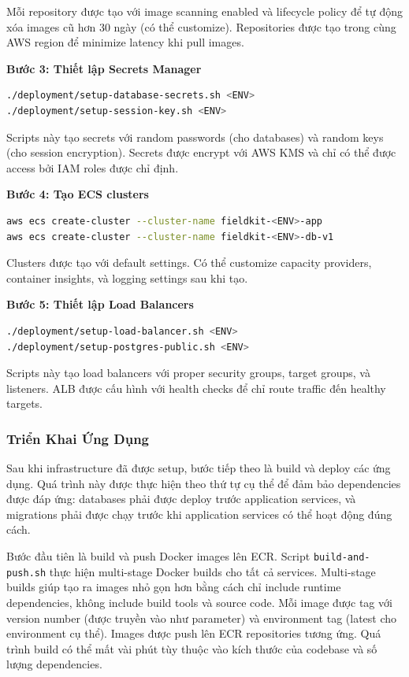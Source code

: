 Mỗi repository được tạo với image scanning enabled và lifecycle policy để tự động xóa images cũ hơn 30 ngày (có thể customize). Repositories được tạo trong cùng AWS region để minimize latency khi pull images.

\textbf{Bước 3: Thiết lập Secrets Manager}
\begin{lstlisting}[language=bash, caption=Thiết lập secrets]
./deployment/setup-database-secrets.sh <ENV>
./deployment/setup-session-key.sh <ENV>
\end{lstlisting}

Scripts này tạo secrets với random passwords (cho databases) và random keys (cho session encryption). Secrets được encrypt với AWS KMS và chỉ có thể được access bởi IAM roles được chỉ định.

\textbf{Bước 4: Tạo ECS clusters}
\begin{lstlisting}[language=bash, caption=Tạo ECS clusters]
aws ecs create-cluster --cluster-name fieldkit-<ENV>-app
aws ecs create-cluster --cluster-name fieldkit-<ENV>-db-v1
\end{lstlisting}

Clusters được tạo với default settings. Có thể customize capacity providers, container insights, và logging settings sau khi tạo.

\textbf{Bước 5: Thiết lập Load Balancers}
\begin{lstlisting}[language=bash, caption=Thiết lập load balancers]
./deployment/setup-load-balancer.sh <ENV>
./deployment/setup-postgres-public.sh <ENV>
\end{lstlisting}

Scripts này tạo load balancers với proper security groups, target groups, và listeners. ALB được cấu hình với health checks để chỉ route traffic đến healthy targets.

\subsubsection{Triển Khai Ứng Dụng}

Sau khi infrastructure đã được setup, bước tiếp theo là build và deploy các ứng dụng. Quá trình này được thực hiện theo thứ tự cụ thể để đảm bảo dependencies được đáp ứng: databases phải được deploy trước application services, và migrations phải được chạy trước khi application services có thể hoạt động đúng cách.

Bước đầu tiên là build và push Docker images lên ECR. Script \texttt{build-and-push.sh} thực hiện multi-stage Docker builds cho tất cả services. Multi-stage builds giúp tạo ra images nhỏ gọn hơn bằng cách chỉ include runtime dependencies, không include build tools và source code. Mỗi image được tag với version number (được truyền vào như parameter) và environment tag (latest cho environment cụ thể). Images được push lên ECR repositories tương ứng. Quá trình build có thể mất vài phút tùy thuộc vào kích thước của codebase và số lượng dependencies.

